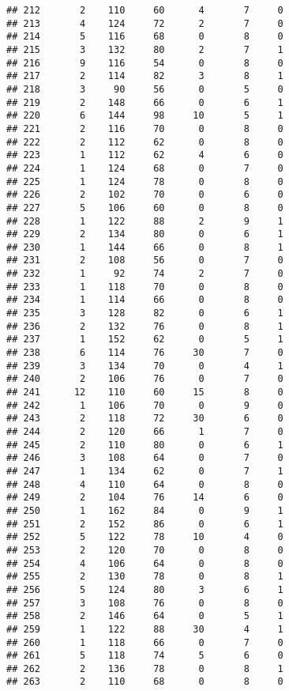 \documentclass[
]{article}
\begin{document}
\begin{verbatim}
## 212       2    110     60      4       7     0
## 213       4    124     72      2       7     0
## 214       5    116     68      0       8     0
## 215       3    132     80      2       7     1
## 216       9    116     54      0       8     0
## 217       2    114     82      3       8     1
## 218       3     90     56      0       5     0
## 219       2    148     66      0       6     1
## 220       6    144     98     10       5     1
## 221       2    116     70      0       8     0
## 222       2    112     62      0       8     0
## 223       1    112     62      4       6     0
## 224       1    124     68      0       7     0
## 225       1    124     78      0       8     0
## 226       2    102     70      0       6     0
## 227       5    106     60      0       8     0
## 228       1    122     88      2       9     1
## 229       2    134     80      0       6     1
## 230       1    144     66      0       8     1
## 231       2    108     56      0       7     0
## 232       1     92     74      2       7     0
## 233       1    118     70      0       8     0
## 234       1    114     66      0       8     0
## 235       3    128     82      0       6     1
## 236       2    132     76      0       8     1
## 237       1    152     62      0       5     1
## 238       6    114     76     30       7     0
## 239       3    134     70      0       4     1
## 240       2    106     76      0       7     0
## 241      12    110     60     15       8     0
## 242       1    106     70      0       9     0
## 243       2    118     72     30       6     0
## 244       2    120     66      1       7     0
## 245       2    110     80      0       6     1
## 246       3    108     64      0       7     0
## 247       1    134     62      0       7     1
## 248       4    110     64      0       8     0
## 249       2    104     76     14       6     0
## 250       1    162     84      0       9     1
## 251       2    152     86      0       6     1
## 252       5    122     78     10       4     0
## 253       2    120     70      0       8     0
## 254       4    106     64      0       8     0
## 255       2    130     78      0       8     1
## 256       5    124     80      3       6     1
## 257       3    108     76      0       8     0
## 258       2    146     64      0       5     1
## 259       1    122     88     30       4     1
## 260       1    118     66      0       7     0
## 261       5    118     74      5       6     0
## 262       2    136     78      0       8     1
## 263       2    110     68      0       8     0

\end{verbatim}
\end{document}
